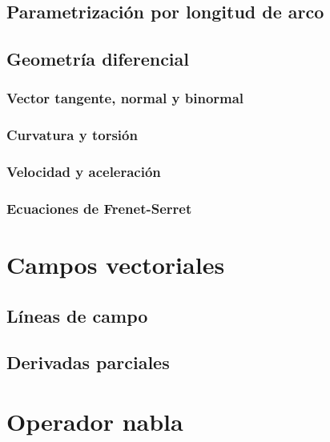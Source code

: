 \documentclass[12pt, fleqn]{report}                             %
\theoremstyle{break}                                            %
\begin{document}
            \subsection{Parametrización por longitud de arco}
            
            \subsection{Geometría diferencial}
                
                \subsubsection{Vector tangente, normal y binormal}
                
                \subsubsection{Curvatura y torsión}
                
                \subsubsection{Velocidad y aceleración}
                
                \subsubsection{Ecuaciones de Frenet-Serret}
            
        \section{Campos vectoriales}
        
            \subsection{Líneas de campo}
            
            \subsection{Derivadas parciales}
        
        \section{Operador nabla}
        
\end{document}
